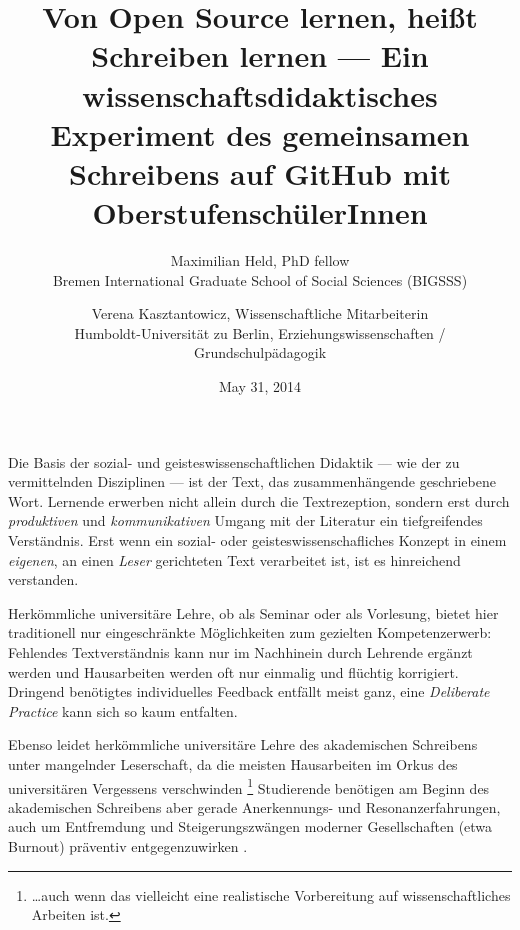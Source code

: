\documentclass[11pt,a4paper,oneside]{article}
\title{
	Von Open Source lernen, heißt Schreiben lernen ---
	Ein wissenschaftsdidaktisches Experiment des gemeinsamen Schreibens auf GitHub mit OberstufenschülerInnen
}
\date{May 31, 2014}
\author{
	Maximilian Held, PhD fellow\\
	Bremen International Graduate School of Social Sciences (BIGSSS)
	\and
	Verena Kasztantowicz, Wissenschaftliche Mitarbeiterin\\
	Humboldt-Universität zu Berlin, Erziehungswissenschaften / Grundschulpädagogik
}
\begin{document}
\maketitle


Die Basis der sozial- und geisteswissenschaftlichen Didaktik --- wie der zu vermittelnden Disziplinen --- ist der Text, das zusammenhängende geschriebene Wort.
Lernende erwerben nicht allein durch die Textrezeption, sondern erst durch \emph{produktiven} und \emph{kommunikativen} Umgang mit der Literatur ein tiefgreifendes Verständnis.
Erst wenn ein sozial- oder geisteswissenschafliches Konzept in einem \emph{eigenen}, an einen \emph{Leser} gerichteten Text verarbeitet ist, ist es hinreichend verstanden.

Herkömmliche universitäre Lehre, ob als Seminar oder als Vorlesung, bietet hier traditionell nur eingeschränkte Möglichkeiten zum gezielten Kompetenzerwerb: Fehlendes Textverständnis kann nur im Nachhinein durch Lehrende ergänzt werden und Hausarbeiten werden oft nur einmalig und flüchtig korrigiert.
Dringend benötigtes individuelles Feedback entfällt meist ganz, eine \emph{Deliberate Practice} \parencite{Ericsson2007} kann sich so kaum entfalten.

Ebenso leidet herkömmliche universitäre Lehre des akademischen Schreibens unter mangelnder Leserschaft, da die meisten Hausarbeiten im Orkus des universitären Vergessens verschwinden
\footnote{
	\ldots auch wenn das vielleicht eine realistische Vorbereitung auf wissenschaftliches Arbeiten ist.
}
Studierende benötigen am Beginn des akademischen Schreibens aber gerade Anerkennungs- und Resonanzerfahrungen, auch um Entfremdung und Steigerungszwängen moderner Gesellschaften (etwa Burnout) präventiv entgegenzuwirken \parencite{Rosa-Paech-etal-2014}.
\end{document}
